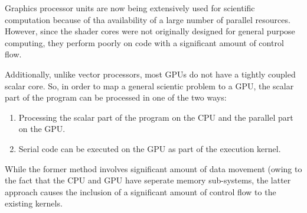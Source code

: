 
\par{Graphics processor units are now being extensively used for scientific computation because of tha availability of a large number of parallel resources. However, since the shader cores were not originally designed for general purpose computing, they perform poorly on code with a significant amount of control flow.}

\par{Additionally, unlike vector processors, most GPUs do not have a tightly coupled scalar core. So, in order to map a general scientic problem to a GPU, the scalar part of the program can be processed in one of the two ways:}

\begin{enumerate}
	\item Processing the scalar part of the program on the CPU and the parallel part on the GPU. 
	\item Serial code can be executed on the GPU as part of the execution kernel.
\end{enumerate} 

While the former method involves significant amount of data movement (owing to the fact that the CPU and GPU have seperate memory sub-systems, the latter approach causes the inclusion of a significant amount of control flow to the existing kernels.
